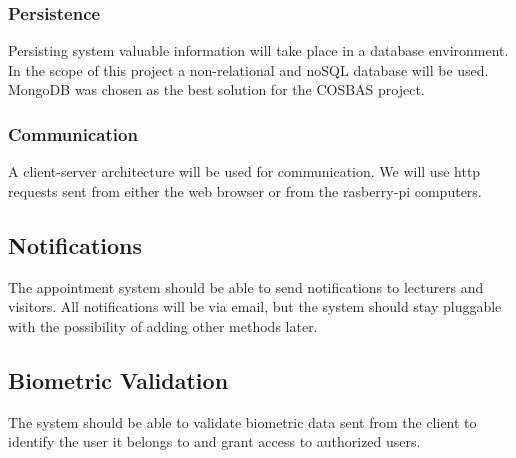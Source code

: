 \subsubsection{Persistence}
Persisting system valuable information will take place in a database environment. In the scope of this project a non-relational and noSQL database will be used. MongoDB was chosen as the best solution for the COSBAS project.

\subsubsection{Communication}
A client-server architecture will be used for communication. We will use http requests sent from either the web browser or from the rasberry-pi computers. 

\subsection{Notifications}
The appointment system should be able to send notifications to lecturers and visitors. All notifications will be via email, but the system should stay pluggable with the possibility of adding other methods later.

\subsection{Biometric Validation}
The system should be able to validate biometric data sent from the client to identify the user it belongs to and grant access to authorized users.